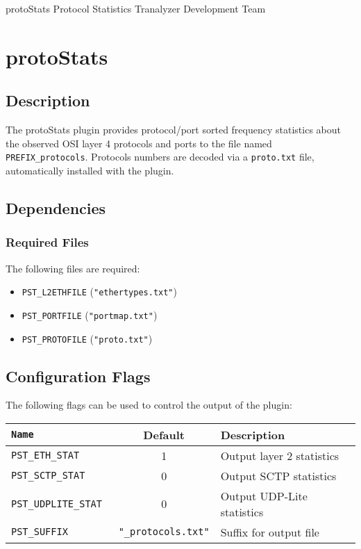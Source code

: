 \documentclass[documentation]{subfiles}
\begin{document}
\trantitle
    {protoStats}
    {Protocol Statistics}
    {Tranalyzer Development Team} %

\section{protoStats}\label{s:protoStats}

\subsection{Description}
The protoStats plugin provides protocol/port sorted frequency statistics about the observed OSI layer 4 protocols and ports to the file named {\tt PREFIX\_protocols}. Protocols numbers are decoded via a {\tt proto.txt} file, automatically installed with the plugin.

\subsection{Dependencies}

\subsubsection{Required Files}
The following files are required:
\begin{itemize}
    \item {\tt PST\_L2ETHFILE} ({\tt "ethertypes.txt"})
    \item {\tt PST\_PORTFILE} ({\tt "portmap.txt"})
    \item {\tt PST\_PROTOFILE} ({\tt "proto.txt"})
\end{itemize}

\subsection{Configuration Flags}
The following flags can be used to control the output of the plugin:
\begin{longtable}{>{\tt}lcl}
    \toprule
    {\bf Name} & {\bf Default} & {\bf Description} \\
    \midrule\endhead%
    PST\_ETH\_STAT     & 1                             & Output layer 2 statistics\\
    PST\_SCTP\_STAT    & 0                             & Output SCTP statistics\\
    PST\_UDPLITE\_STAT & 0                             & Output UDP-Lite statistics\\
    PST\_SUFFIX        & {\tt\small "\_protocols.txt"} & Suffix for output file\\
    \bottomrule
\end{longtable}
\end{document}
